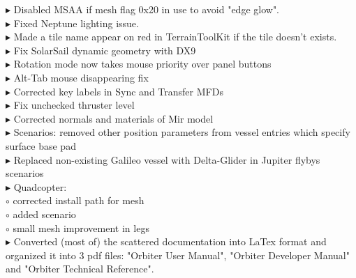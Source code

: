 \documentclass[Orbiter User Manual.tex]{subfiles}
\begin{document}
$\blacktriangleright$ Disabled MSAA if mesh flag 0x20 in use to avoid "edge glow".\\
$\blacktriangleright$ Fixed Neptune lighting issue.\\
$\blacktriangleright$ Made a tile name appear on red in TerrainToolKit if the tile doesn't exists.\\
$\blacktriangleright$ Fix SolarSail dynamic geometry with DX9\\
$\blacktriangleright$ Rotation mode now takes mouse priority over panel buttons\\
$\blacktriangleright$ Alt-Tab mouse disappearing fix\\
$\blacktriangleright$ Corrected key labels in Sync and Transfer MFDs\\
$\blacktriangleright$ Fix unchecked thruster level\\
$\blacktriangleright$ Corrected normals and materials of Mir model\\
$\blacktriangleright$ Scenarios: removed other position parameters from vessel entries which specify surface base pad\\
$\blacktriangleright$ Replaced non-existing Galileo vessel with Delta-Glider in Jupiter flybys scenarios\\
$\blacktriangleright$ Quadcopter:\\
$\circ$ corrected install path for mesh\\
$\circ$ added scenario\\
$\circ$ small mesh improvement in legs\\
$\blacktriangleright$ Converted (most of) the scattered documentation into LaTex format and organized it into 3 pdf files: "Orbiter User Manual", "Orbiter Developer Manual" and "Orbiter Technical Reference".\\
\end{document}
